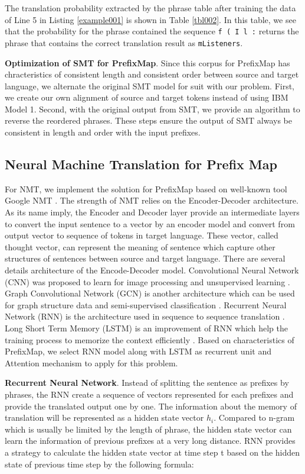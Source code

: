 The translation probability extracted by the phrase table after training the data of Line 5 in Listing \ref{example001} is shown in Table \ref{tbl002}. In this table, we see that the probability for the phrase contained the sequence \texttt{f ( I l :} returns the phrase that contains the correct translation result as \texttt{mListeners}.

\textbf{Optimization of SMT for PrefixMap}. Since this corpus for PrefixMap has chracteristics of consistent length and consistent order between source and target language, we alternate the original SMT model for suit with our problem. First, we create our own alignment of source and target tokens instead of using IBM Model 1. Second, with the original output from SMT, we provide an algorithm to reverse the reordered phrases. These steps ensure the output of SMT always be consistent in length and order with the input prefixes.






\subsection{Neural Machine Translation for Prefix Map}
For NMT, we implement the solution for PrefixMap based on well-known tool Google NMT \cite{040}. The strength of NMT relies on the Encoder-Decoder architecture. As its name imply, the Encoder and Decoder layer provide an intermediate layers to convert the input sentence to a vector by an encoder model and convert from output vector to sequence of tokens in target language. These vector, called thought vector, can represent the meaning of sentence which capture other structures of sentences between source and target language. There are several details architecture of the Encode-Decoder model. Convolutional Neural Network (CNN) was proposed to learn for image processing and unsupervised learning \cite{041,042}. Graph Convolutional Network (GCN) is another architecture which can be used for graph structure data and semi-supervised classification \cite{043}. Recurrent Neural Network (RNN) is the architecture used in sequence to sequence translation \cite{044}. Long Short Term Memory (LSTM) is an improvement of RNN which help the training process to memorize the context efficiently \cite{044}. Based on characteristics of PrefixMap, we select RNN model along with LSTM as recurrent unit and Attention mechanism to apply for this problem.

\textbf{Recurrent Neural Network}. Instead of splitting the sentence as prefixes by phrases, the RNN create a sequence of vectors represented for each prefixes and provide the translated output one by one. The information about the memory of translation will be represented as a hidden state vector $h_{i}$. Compared to n-gram which is usually be limited by the length of phrase, the hidden state vector can learn the information of previous prefixes at a very long distance. RNN provides a strategy to calculate the hidden state vector at time step t based on the hidden state of previous time step by the following formula:

